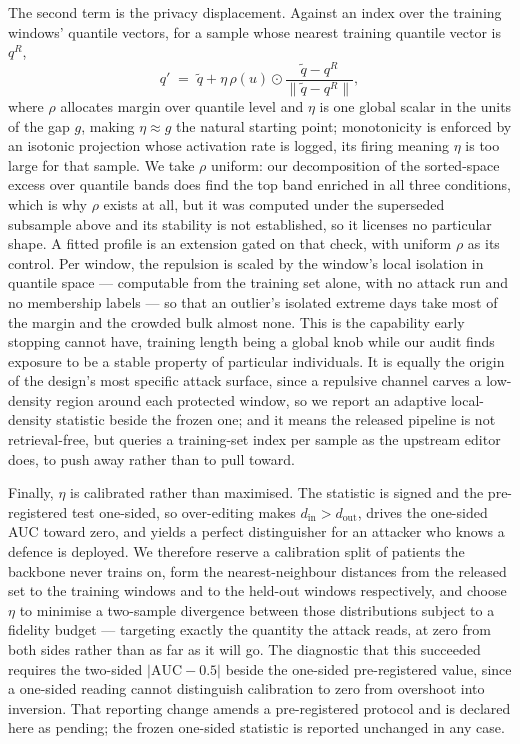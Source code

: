 \documentclass[journal]{IEEEtran}
\begin{document}
The second term is the privacy displacement. Against an index over the training windows'
quantile vectors, for a sample whose nearest training quantile vector is $q^{R}$,
\begin{equation}
q'\;=\;\tilde q+\eta\,\rho(u)\odot\frac{\tilde q-q^{R}}{\lVert\tilde q-q^{R}\rVert},
\label{eq:repel}
\end{equation}
where $\rho$ allocates margin over quantile level and $\eta$ is one global scalar in the
units of the gap $g$, making $\eta\approx g$ the natural starting point; monotonicity is
enforced by an isotonic projection whose activation rate is logged, its firing meaning $\eta$
is too large for that sample. We take $\rho$ uniform: our decomposition of the sorted-space
excess over quantile bands does find the top band enriched in all three conditions, which is
why $\rho$ exists at all, but it was computed under the superseded subsample above and its
stability is not established, so it licenses no particular shape. A fitted profile is an
extension gated on that check, with uniform $\rho$ as its control. Per window, the repulsion
is scaled by the window's local isolation in quantile space --- computable from the training
set alone, with no attack run and no membership labels --- so that an outlier's isolated
extreme days take most of the margin and the crowded bulk almost none. This is the capability
early stopping cannot have, training length being a global knob while our audit finds
exposure to be a stable property of particular individuals. It is equally the origin of the
design's most specific attack surface, since a repulsive channel carves a low-density region
around each protected window, so we report an adaptive local-density statistic beside the
frozen one; and it means the released pipeline is not retrieval-free, but queries a
training-set index per sample as the upstream editor does, to push away rather than to pull
toward.

Finally, $\eta$ is calibrated rather than maximised. The statistic is signed and the
pre-registered test one-sided, so over-editing makes $d_{\text{in}}>d_{\text{out}}$, drives
the one-sided AUC toward zero, and yields a perfect distinguisher for an attacker who knows a
defence is deployed. We therefore reserve a calibration split of patients the backbone never
trains on, form the nearest-neighbour distances from the released set to the training windows
and to the held-out windows respectively, and choose $\eta$ to minimise a two-sample
divergence between those distributions subject to a fidelity budget --- targeting exactly the
quantity the attack reads, at zero from both sides rather than as far as it will go. The
diagnostic that this succeeded requires the two-sided $|\mathrm{AUC}-0.5|$ beside the
one-sided pre-registered value, since a one-sided reading cannot distinguish calibration to
zero from overshoot into inversion. That reporting change amends a pre-registered protocol
and is declared here as pending; the frozen one-sided statistic is reported unchanged in any
case.
\end{document}
